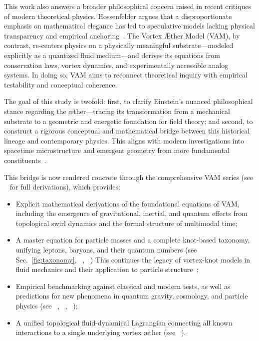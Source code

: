 This work also answers a broader philosophical concern raised in recent critiques of modern theoretical physics. Hossenfelder argues that a disproportionate emphasis on mathematical elegance has led to speculative models lacking physical transparency and empirical anchoring~\cite{hossenfelder2018lost}. The Vortex Æther Model (VAM), by contrast, re-centers physics on a physically meaningful substrate—modeled explicitly as a quantized fluid medium—and derives its equations from conservation laws, vortex dynamics, and experimentally accessible analog systems. In doing so, VAM aims to reconnect theoretical inquiry with empirical testability and conceptual coherence.

The goal of this study is twofold: first, to clarify Einstein’s nuanced philosophical stance regarding the æther—tracing its transformation from a mechanical substrate to a geometric and energetic foundation for field theory; and second, to construct a rigorous conceptual and mathematical bridge between this historical lineage and contemporary physics. This aligns with modern investigations into spacetime microstructure and emergent geometry from more fundamental constituents~\cite{hossenfelder2018lost}.


This bridge is now rendered concrete through the comprehensive VAM series (see ~\cite{VAM-8} for full derivations), which provides:

\begin{itemize}
    \item Explicit mathematical derivations of the foundational equations of VAM, including the emergence of gravitational, inertial, and quantum effects from topological swirl dynamics and the formal structure of multimodal time;
    \item A master equation for particle masses and a complete knot-based taxonomy, unifying leptons, baryons, and their quantum numbers (see Sec.~\ref{fig:taxonomy}, ~\cite{VAM-8}, ~\cite{VAM-11}) This continues the legacy of vortex-knot models in fluid mechanics and their application to particle structure~\cite{knot_theroy_in_fluid};
    \item Empirical benchmarking against classical and modern tests, as well as predictions for new phenomena in quantum gravity, cosmology, and particle physics (see ~\cite{VAM-8}, ~\cite{VAM-12}, ~\cite{VAM-15});
    \item A unified topological fluid-dynamical Lagrangian connecting all known interactions to a single underlying vortex æther (see ~\cite{VAM-14}).
\end{itemize}

